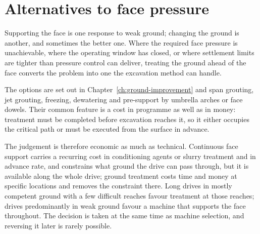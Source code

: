 \section{Alternatives to face pressure}
\label{sec:alternatives-face-pressure}

Supporting the face is one response to weak ground; changing the ground is
another, and sometimes the better one. Where the required face pressure is
unachievable, where the operating window has closed, or where settlement
limits are tighter than pressure control can deliver, treating the ground
ahead of the face converts the problem into one the excavation method can
handle.

The options are set out in Chapter~\ref{ch:ground-improvement} and span
grouting, jet grouting, freezing, dewatering and pre-support by umbrella
arches or face dowels. Their common feature is a cost in programme as well
as in money: treatment must be completed before excavation reaches it, so
it either occupies the critical path or must be executed from the surface in
advance.

The judgement is therefore economic as much as technical. Continuous face
support carries a recurring cost in conditioning agents or slurry treatment
and in advance rate, and constrains what ground the drive can pass through,
but it is available along the whole drive; ground treatment costs time and
money at specific locations and removes the constraint there. Long drives in mostly
competent ground with a few difficult reaches favour treatment at those
reaches; drives predominantly in weak ground favour a machine that supports
the face throughout. The decision is taken at the same time as machine
selection, and reversing it later is rarely possible.

\chapterreferences

